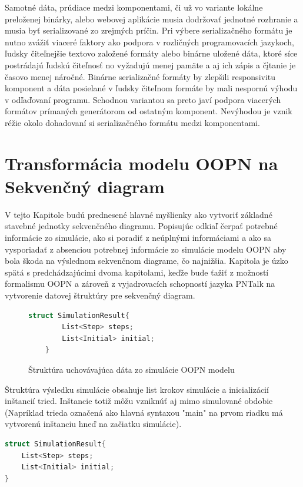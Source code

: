 Samotné dáta, prúdiace medzi komponentami, či už vo variante lokálne preloženej binárky, alebo webovej aplikácie musia dodržovať jednotné rozhranie a musia byť serializované zo zrejmých príčin. Pri výbere serializačného formátu je nutno zvážiť viaceré faktory ako podpora v rozličných programovacích jazykoch, ľudsky čiteľnejšie textovo založené formáty alebo binárne uložené dáta, ktoré síce postrádajú ľudskú čiteľnosť no vyžadujú menej pamäte a aj ich zápis a čįtanie je časovo menej náročné. Binárne serializačné formáty by zlepšili responsivitu komponent a dáta posielané v ľudsky čiteľnom formáte by mali nespornú výhodu v odľaďovaní programu. Schodnou variantou sa preto javí podpora viacerých formátov prímaných generátorom od ostatným komponent. Nevýhodou je vznik réžie okolo dohadovaní si serializačného formátu medzi komponentami.

\section{Transformácia modelu OOPN na Sekvenčný diagram}

V tejto Kapitole budú prednesené hlavné myšlienky ako vytvoriť základné stavebné jednotky sekvenčného diagramu. Popisujúc odkiaľ čerpať potrebné informácie zo simulácie, ako si poradiť z neúplnými informáciami a ako sa vysporiadať z absenciou potrebnej informácie zo simulácie modelu OOPN aby bola škoda na výslednom sekvenčnom diagrame, čo najnižšia. Kapitola je úzko spätá s predchádzajúcimi dvoma kapitolami, keďže bude ťažiť z možností formalismu OOPN a zároveň z vyjadrovacích schopností jazyka PNTalk na vytvorenie datovej štruktúry pre sekvenčný diagram.

\begin{figure} [H]
	\begin{lstlisting}[language=C++]
	struct SimulationResult{
		List<Step> steps;
		List<Initial> initial;
	}
	\end{lstlisting}
	\caption{Štruktúra uchovávajúca dáta zo simulácie OOPN modelu}
\end{figure}

Štruktúra výsledku simulácie obsahuje list krokov simulácie a inicializácií inštancií tried. Inštancie totiž môžu vzniknúť aj mimo simulované obdobie (Napríklad trieda označená ako hlavná syntaxou "main" na prvom riadku má vytvorenú inštanciu hneď na začiatku simulácie).

\begin{lstlisting}[language=C++]
struct SimulationResult{
	List<Step> steps;
	List<Initial> initial;
}
\end{lstlisting}

